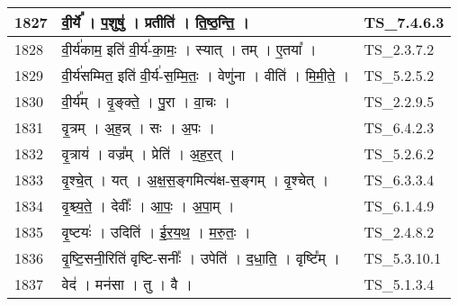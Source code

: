 \documentclass[17pt]{extarticle}
\begin{document}
\begin{longtable}{||p{0.4in}||p{4.9in}||p{0.9in}||}
    \hline
        
    1827 & वी॒र्ये᳚   ।   प॒शुषु॑   ।   प्रतीति॑   ।   ति॒ष्ठ॒न्ति॒   ।    & TS\_7.4.6.3       \\
    
    \hline
        
    1828 & वी॒र्य॑काम॒ इति॑ वी॒र्य॑{-}का॒मः॒   ।   स्यात्   ।   तम्   ।   ए॒तया᳚   ।    & TS\_2.3.7.2       \\
    
    \hline
        
    1829 & वी॒र्य॑सम्मित॒ इति॑ वी॒र्य॑{-}स॒म्मि॒तः॒   ।   वेणु॑ना   ।   वीति॑   ।   मि॒मी॒ते॒   ।    & TS\_5.2.5.2       \\
    
    \hline
        
    1830 & वी॒र्य᳚म्   ।   वृ॒ङ्क्ते॒   ।   पु॒रा   ।   वा॒चः   ।    & TS\_2.2.9.5       \\
    
    \hline
        
    1831 & वृ॒त्रम्   ।   अ॒ह॒न्न्   ।   सः   ।   अ॒पः   ।    & TS\_6.4.2.3       \\
    
    \hline
        
    1832 & वृ॒त्राय॑   ।   वज्र᳚म्   ।   प्रेति॑   ।   अ॒ह॒र॒त्   ।    & TS\_5.2.6.2       \\
    
    \hline
        
    1833 & वृ॒श्चे॒त्   ।   यत्   ।   अ॒क्ष॒स॒ङ्गमित्य॑क्ष{-}स॒ङ्गम्   ।   वृ॒श्चेत्   ।    & TS\_6.3.3.4       \\
    
    \hline
        
    1834 & वृ॒श्च्य॒ते॒   ।   देवीः᳚   ।   आ॒पः॒   ।   अ॒पा॒म्   ।    & TS\_6.1.4.9       \\
    
    \hline
        
    1835 & वृ॒ष्टयः॑   ।   उदिति॑   ।   ई॒र॒य॒थ॒   ।   म॒रु॒तः॒   ।    & TS\_2.4.8.2       \\
    
    \hline
        
    1836 & वृ॒ष्टि॒सनी॒रिति॑ वृष्टि{-}सनीः᳚   ।   उपेति॑   ।   द॒धा॒ति॒   ।   वृष्टि᳚म्   ।    & TS\_5.3.10.1       \\
    
    \hline
        
    1837 & वेद॑   ।   मन॑सा   ।   तु   ।   वै   ।    & TS\_5.1.3.4       \\
    

\end{longtable}
\end{document}
